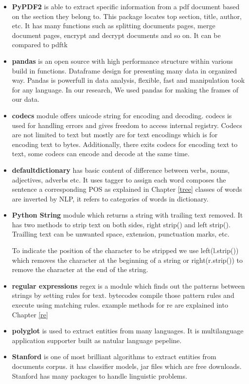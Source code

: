 \begin{itemize}
\item \textbf{PyPDF2} is able to extract specific information from a pdf document based on the section they belong to. This package locates top section, title, author, etc. It has many functions such as splitting documents pages, merge document pages, encrypt and decrypt documents and so on. It can be compared to pdftk
\item \textbf{pandas} is an open source with high performance structure within various build in functions.
  Dataframe design for presenting many data in organized way. Pandas is powerfull in data analysis, flexible, fast and manipulation took for any language. In our research, We used pandas for making the frames of our data.
\item \textbf{codecs} module  offers unicode string for encoding and decoding. codecs is used for handling errors and gives freedom to access internal registry. Codecs are not limited to text but mostly are for text encodings which is for encoding text to bytes. Additionally, there exits codecs for encoding text to text, some codecs can encode and decode at the same time.
\item  \textbf{defaultdictionary} has basic content of difference between verbs, nouns, adjectives, adverbs etc. It uses tagger to assign each word composes the sentence a corresponding POS as explained in Chapter \ref{tree} classes of words are inverted by NLP, it refers to categories of words in dictionary.
\item \textbf{Python String} module which returns a string with trailing text removed.
  It has two methods to strip text on both sides, right strip() and left strip(). Trailling text can be  unwanted space, extension, punctuation marks, etc.

To indicate the position of the character to be stripped we use left(l.strip()) which removes the character at the beginning of a string or right(r.strip()) to remove the character at the end of the string.
\item \textbf{regular expressions } regex is a module which finds out the patterns between strings by setting rules for text. bytecodes compile those pattern rules and execute using matching rules.  example methods for re are explained into Chapter \ref{re}
\item \textbf{polyglot} is used to extract entities from many languages.  It is multilanguage application supporter built as natular language pepeline.
\item \textbf{Stanford} is one of most brilliant algorithms to extract entities from  documents corpus. it has classifier models, jar files which are free downloads. Stanford has many packages to handle linguistic problems. 
\end{itemize}


